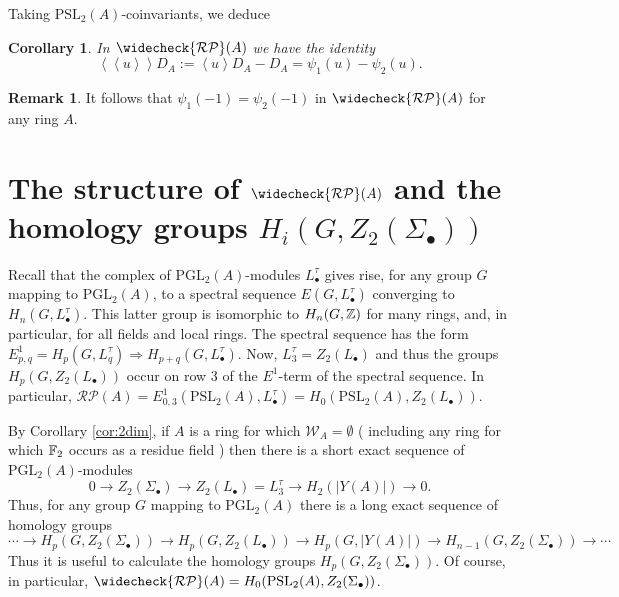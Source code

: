 \documentclass[12pt]{amsart}
\newtheorem{cor}[lem]{Corollary}
\theoremstyle{definition}
\newtheorem{rem}[lem]{Remark}
\newcommand{\F}[1]{\Bbb{F}_{#1}}
\newcommand{\Z}{\Bbb{Z}}
\newcommand{\wn}[1]{\mathcal{W}_{#1}}%
\newcommand{\pspl}[2]{\mathrm{PSL}_{#1}(#2)}
\newcommand{\pgl}[2]{\mathrm{PGL}_{#1}(#2)}
\newcommand{\rpb}[1]{\mathcal{RP}(#1)}%
\newcommand{\crpb}[1]{\widecheck{\mathcal{RP}}(#1)}
\newcommand{\suss}[2]{\psi_{#1}\left( #2\right)}
\newcommand{\cconst}[1]{D_{#1}}
\newcommand{\<}{\langle}
\renewcommand{\>}{\rangle}
\newcommand{\sgr}[1]{\mathrm{R}_{#1}}%
\newcommand{\an}[1]{\left\langle{#1}\right\rangle}
\newcommand{\pf}[1]{\left\langle\!\left\langle{#1}\right\rangle\!\right\rangle}
\begin{document}
Taking $\pspl{2}{A}$-coinvariants, we deduce
\begin{cor}\label{cor:key}
 In $ \crpb{A}$ we have the identity
\[
\pf{u}\cconst{A}:=\an{u}\cconst{A}-\cconst{A}=\suss{1}{u}-\suss{2}{u}.
\]
\end{cor}

\begin{rem} It follows that $\suss{1}{-1}=\suss{2}{-1}$ in $\crpb{A}$ for any ring $A$.
\end{rem}
\section{The structure of $\crpb{A}$ and the homology groups $H_i(G,Z_2(\Sigma_\bullet))$}\label{sec:crpba}
Recall that the complex of $\pgl{2}{A}$-modules $L_\bullet^\tau$  gives rise, for any group $G$ mapping to $\pgl{2}{A}$,  to a spectral sequence $E(G, L_\bullet^\tau)$ converging to $H_n(G,L_\bullet^\tau)$. This latter group is isomorphic to $H_n(G,\Z)$ for many rings, and, in particular, for all fields and local rings. The spectral sequence has the form $E^1_{p,q}=H_p(G, L_q^\tau)\Longrightarrow H_{p+q}(G, L_\bullet^\tau)$. Now, $L_3^\tau=Z_2(L_\bullet)$ and thus the groups $H_p(G,Z_2(L_\bullet))$ occur on row $3$ of the $E^1$-term of the spectral sequence. In particular, $\rpb{A}=E^1_{0,3}(\pspl{2}{A}, L_\bullet^\tau)=H_0(\pspl{2}{A}, Z_2(L_\bullet))$. 

By Corollary \ref{cor:2dim}, if $A$ is a ring for which $\wn{A}=\emptyset$ ( including any ring for which $\F{2}$ occurs as a residue field ) then there is a short exact sequence of $\pgl{2}{A}$-modules 
\[
0\to Z_2(\Sigma_\bullet)\to Z_2(L_\bullet)=L_3^\tau\to H_2(|Y(A)|)\to 0.
\]
Thus, for any group $G$ mapping to $\pgl{2}{A}$ there is a long exact sequence of homology groups
\[
\cdots \to H_p(G,Z_2(\Sigma_\bullet))\to H_p(G,Z_2(L_\bullet))\to H_p(G,|Y(A)|)\to H_{n-1}(G,Z_2(\Sigma_\bullet))\to\cdots
\]
Thus it is useful to calculate the homology groups $H_p(G,Z_2(\Sigma_\bullet))$. Of course, in particular, $\crpb{A}=H_0(\pspl{2}{A},Z_2(\Sigma_\bullet))$.
\end{document}
